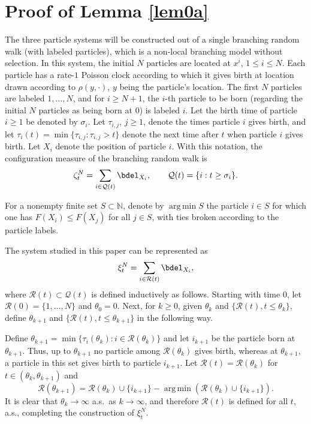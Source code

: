 \documentclass[11pt]{amsart}
\DeclareMathOperator*{\argmin}{arg\,min}
\theoremstyle{plain}
\newcommand{\sig}{\sigma}
\newcommand{\N}{{\mathbb N}}
\newcommand{\calQ}{{\mathcal Q}}
\newcommand{\calR}{{\mathcal R}}
\newcommand{\iy}{\infty}
\begin{document}
\appendix

\section{Proof of Lemma \ref{lem0a}}

The three particle systems will be constructed out of a single branching random walk (with labeled particles), which is a non-local branching model without selection. In this system, the initial $N$ particles are located at $x^i$, $1\le i\le N$. Each particle has a rate-$1$ Poisson clock according to which it gives birth at location drawn according to $\rho(y,\cdot)$, $y$ being the particle's location. The first $N$ particles are labeled $1,\ldots,N$, and for $i\ge N+1$, the $i$-th particle to be born (regarding the initial $N$ particles as being born at $0$) is labeled $i$. Let the birth time of particle $i\ge1$ be denoted by $\sig_i$. Let $\tau_{i,j}$, $j\ge1$, denote the times particle $i$ gives birth, and let $\tau_i(t)=\min\{\tau_{i,j}:\tau_{i,j}>t\}$ denote the next time after $t$ when particle $i$ gives birth.
Let $X_i$ denote the position of particle $i$. With this notation, the configuration measure of the branching random walk is
\[
\zeta^N_t=\sum_{i\in\calQ(t)}\bdel_{X_i},
\qquad
\calQ(t)=\{i:t\ge\sig_i\}.
\]

For a nonempty finite set $S\subset\N$, denote by $\argmin S$ the particle $i\in S$ for which one has $F(X_i)\le F(X_j)$ for all $j\in S$, with ties broken according to the particle labels.

The system studied in this paper can be represented as
\[
\xi^N_t=\sum_{i\in\calR(t)}\bdel_{X_i},
\]
where $\calR(t)\subset\calQ(t)$ is defined inductively as follows.
Starting with time $0$, let $\calR(0)=\{1,\ldots,N\}$ and $\theta_0=0$. Next, for $k\ge0$, given $\theta_k$ and $\{\calR(t), t\le \theta_k\}$, define $\theta_{k+1}$ and $\{\calR(t), t\le \theta_{k+1}\}$ in the following way.

Define $\theta_{k+1}=\min\{\tau_i(\theta_k):i\in\calR(\theta_k)\}$ and let $i_{k+1}$ be the particle born at $\theta_{k+1}$. Thus, up to $\theta_{k+1}$ no particle among $\calR(\theta_k)$ gives birth, whereas at $\theta_{k+1}$, a particle in this set gives birth to particle $i_{k+1}$. Let $\calR(t)=\calR(\theta_k)$ for $t\in(\theta_k,\theta_{k+1})$ and
\[
\calR(\theta_{k+1})=\calR(\theta_k)\cup\{i_{k+1}\}- \argmin(\calR(\theta_k)\cup\{i_{k+1}\}).
\]
It is clear that $\theta_k\to\iy$ a.s.\ as $k\to\iy$, and therefore $\calR(t)$ is defined for all $t$, a.s., completing the construction of $\xi^N_t$.
\end{document}
